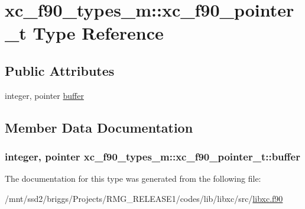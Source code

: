 \hypertarget{structxc__f90__types__m_1_1xc__f90__pointer__t}{\section{xc\-\_\-f90\-\_\-types\-\_\-m\-:\-:xc\-\_\-f90\-\_\-pointer\-\_\-t Type Reference}
\label{structxc__f90__types__m_1_1xc__f90__pointer__t}
}
\subsection*{Public Attributes}
\begin{DoxyCompactItemize}
\item 
integer, pointer \hyperlink{structxc__f90__types__m_1_1xc__f90__pointer__t_ac87882f6ebc5d44ddcd379d6d4649e39}{buffer}
\end{DoxyCompactItemize}


\subsection{Member Data Documentation}
\hypertarget{structxc__f90__types__m_1_1xc__f90__pointer__t_ac87882f6ebc5d44ddcd379d6d4649e39}{
\subsubsection[{buffer}]{\setlength{\rightskip}{0pt plus 5cm}integer, pointer xc\-\_\-f90\-\_\-types\-\_\-m\-::xc\-\_\-f90\-\_\-pointer\-\_\-t\-::buffer}}\label{structxc__f90__types__m_1_1xc__f90__pointer__t_ac87882f6ebc5d44ddcd379d6d4649e39}


The documentation for this type was generated from the following file\-:\begin{DoxyCompactItemize}
\item 
/mnt/ssd2/briggs/\-Projects/\-R\-M\-G\-\_\-\-R\-E\-L\-E\-A\-S\-E1/codes/lib/libxc/src/\hyperlink{libxc_8f90}{libxc.\-f90}\end{DoxyCompactItemize}
